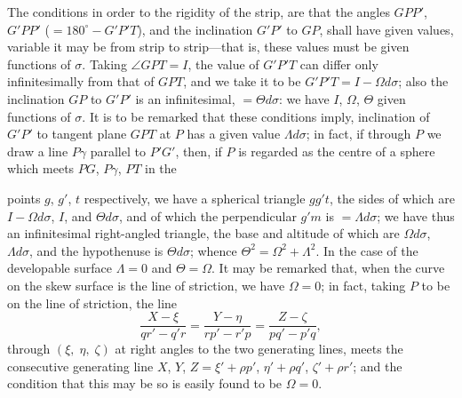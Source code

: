 \documentclass[11pt,a4paper]{book}
\begin{document}
The conditions in order to the rigidity of the strip, are that the angles $GPP'$, $G'PP'$ ($= 180^{\circ} - G'P'T$), and the inclination $G'P'$ to $GP$, shall have given values, variable it may be from strip to strip---that is, these values must be given functions of $\sigma$. Taking $\angle GPT = I$, the value of $G'P'T$ can differ only infinitesimally from that of $GPT$, and we take it to be $G'P'T = I - \Omega d\sigma$; also the inclination $GP$ to $G'P'$ is an infinitesimal, $= \Theta d\sigma$: we have $I$, $\Omega$, $\Theta$ given functions of $\sigma$. It is to be remarked that these conditions imply, inclination of $G'P'$ to tangent plane $GPT$ at $P$ has a given value $\Lambda d\sigma$; in fact, if through $P$ we draw a line $P\gamma$ parallel to $P'G'$, then, if $P$ is regarded as the centre of a sphere which meets $PG$, $P\gamma$, $PT$ in the

\newpage
\noindent points $g$, $g'$, $t$ respectively, we have a spherical triangle $gg't$, the sides of which are $I - \Omega d\sigma$, $I$, and $\Theta d\sigma$, and of which the perpendicular $g'm$ is $= \Lambda d\sigma$; we have thus an infinitesimal right-angled triangle, the base and altitude of which are $\Omega d\sigma$, $\Lambda d\sigma$, and the hypothenuse is $\Theta d\sigma$; whence $\Theta^2 = \Omega^2 + \Lambda^2$. In the case of the developable surface $\Lambda = 0$ and $\Theta = \Omega$. It may be remarked that, when the curve on the skew surface is the line of striction, we have $\Omega = 0$; in fact, taking $P$ to be on the line of striction, the line
\[
\frac{X - \xi}{qr' - q'r} = \frac{Y - \eta}{rp' - r'p} = \frac{Z - \zeta}{pq' - p'q},
\]
through $(\xi,\; \eta,\; \zeta)$ at right angles to the two generating lines, meets the consecutive generating line $X$, $Y$, $Z = \xi' + \rho p'$, $\eta' + \rho q'$, $\zeta' + \rho r'$; and the condition that this may be so is easily found to be $\Omega = 0$.
\end{document}
